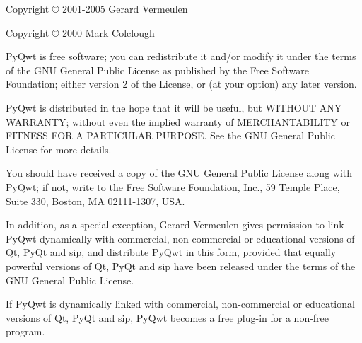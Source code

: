 Copyright \copyright{} 2001-2005 Gerard Vermeulen

Copyright \copyright{} 2000 Mark Colclough

PyQwt is free software; you can redistribute it and/or modify it under the
terms of the GNU General Public License as published by the Free Software
Foundation; either version 2 of the License, or (at your option) any later
version.

PyQwt is distributed in the hope that it will be useful, but WITHOUT ANY
WARRANTY; without even the implied warranty of MERCHANTABILITY or FITNESS
FOR A PARTICULAR PURPOSE.  See the GNU  General Public License for more
details.

You should have received a copy of the GNU General Public License along with
PyQwt; if not, write to the Free Software Foundation, Inc., 59 Temple Place,
Suite 330, Boston, MA 02111-1307, USA.

In addition, as a special exception, Gerard Vermeulen gives permission to
link PyQwt dynamically with commercial, non-commercial or educational 
versions of Qt, PyQt and sip, and distribute PyQwt in this form, provided
that equally powerful versions of Qt, PyQt and sip have been released under
the terms of the GNU General Public License.

If PyQwt is dynamically linked with commercial, non-commercial or
educational versions of Qt, PyQt and sip, PyQwt becomes a free plug-in
for a non-free program.
